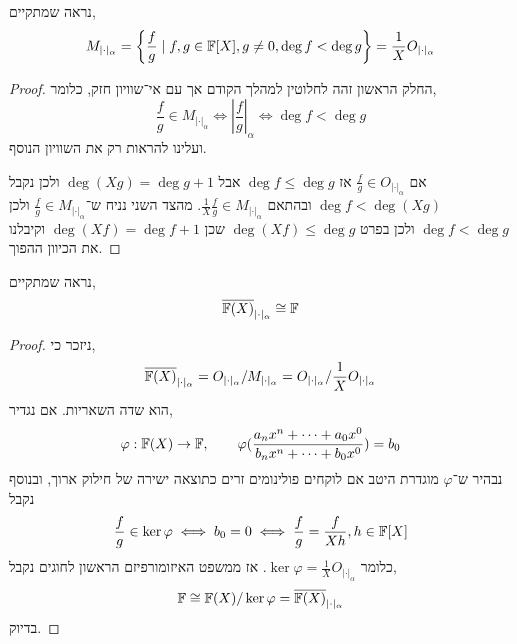 \subquestion{}
נראה שמתקיים,
\[
	M_{| \cdot |_{\alpha}}
	= \left\{ \frac{f}{g} \mid f, g \in \mathbb{F}[X], g \ne 0, \deg f < \deg g \right\}
	= \frac{1}{X} O_{| \cdot |_{\alpha}}
\]
\begin{proof}
	החלק הראשון זהה לחלוטין למהלך הקודם אך עם אי־שוויון חזק, כלומר,
	\[
		\frac{f}{g} \in M_{| \cdot |_{\alpha}}
		\iff | \frac{f}{g} |_{\alpha}
		\iff \deg f < \deg g
	\]
	ועלינו להראות רק את השוויון הנוסף.

	אם $\frac{f}{g} \in O_{| \cdot |_{\alpha}}$ אז $\deg f \le \deg g$ אבל $\deg (X g) = \deg g + 1$ ולכן נקבל $\deg f < \deg(X g)$ ובהתאם $\frac{1}{X} \frac{f}{g} \in M_{| \cdot |_{\alpha}}$.
	מהצד השני נניח ש־$\frac{f}{g} \in M_{| \cdot |_{\alpha}}$ ולכן $\deg f < \deg g$ ולכן בפרט $\deg(X f) \le \deg g$ שכן $\deg(Xf) = \deg f + 1$ וקיבלנו את הכיוון ההפוך.
\end{proof}

\subquestion{}
נראה שמתקיים,
\[
	\overline{\mathbb{F}(X)}_{| \cdot |_{\alpha}}
	\cong \mathbb{F}
\]
\begin{proof}
	ניזכר כי,
	\[
		\overline{\mathbb{F}(X)}_{| \cdot |_{\alpha}}
		= O_{| \cdot |_{\alpha}} / M_{| \cdot |_{\alpha}}
		= O_{| \cdot |_{\alpha}} / \frac{1}{X} O_{| \cdot |_{\alpha}}
	\]
	הוא שדה השאריות.
	אם נגדיר,
	\[
		\varphi : \mathbb{F}(X) \to \mathbb{F},
		\qquad
		\varphi(\frac{a_n x^n + \cdots + a_0 x^0}{b_n x^n + \cdots + b_0 x^0}) = b_0
	\]
	נבהיר ש־$\varphi$ מוגדרת היטב אם לוקחים פולינומים זרים כתוצאה ישירה של חילוק ארוך,
	ובנוסף נקבל
	\[
		\frac{f}{g} \in \ker \varphi
		\iff b_0 = 0
		\iff \frac{f}{g} = \frac{f}{X h}, h \in \mathbb{F}[X]
	\]
	כלומר $\ker \varphi = \frac{1}{X} O_{| \cdot |_{\alpha}}$.
	אז ממשפט האיזומורפיזם הראשון לחוגים נקבל,
	\[
		\mathbb{F}
		\cong
		\mathbb{F}(X) / \ker \varphi
		= \overline{\mathbb{F}(X)}_{| \cdot |_{\alpha}}
	\]
	בדיוק.
\end{proof}


